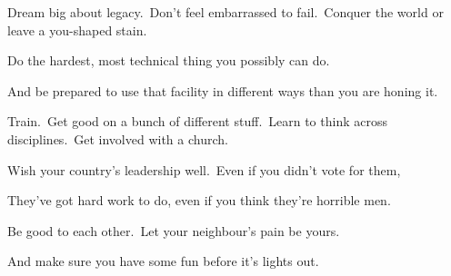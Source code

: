 Dream big about legacy.\ Don't feel embarrassed to fail.\ Conquer the world or leave a you-shaped stain.

Do the hardest, most technical thing you possibly can do.

And be prepared to use that facility in different ways than you are honing it.

Train.\ Get good on a bunch of different stuff.\ Learn to think across disciplines.\ Get involved with a church.

Wish your country's leadership well.\ Even if you didn't vote for them,

They've got hard work to do, even if you think they're horrible men.

Be good to each other.\ Let your neighbour's pain be yours.

And make sure you have some fun before it's lights out.